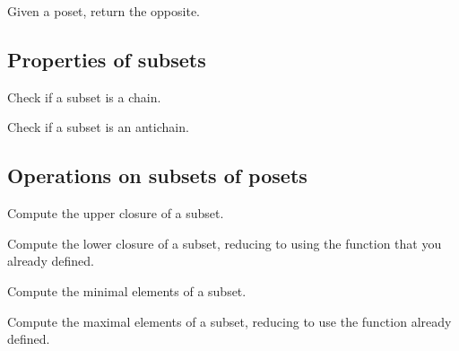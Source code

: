 \begin{exercise}
  Given a poset, return the opposite.
\end{exercise}

\subsection{Properties of subsets}


\begin{exercise}
  Check if a subset is a chain.
\end{exercise}

\begin{exercise}
  Check if a subset is an antichain.
\end{exercise}

\subsection{Operations on subsets of posets}

\begin{exercise}
  Compute the upper closure of a subset.

\end{exercise}


\begin{exercise}
  Compute the lower closure of a subset, reducing to
  using the function  that you
  already defined.

\end{exercise}



\begin{exercise}
  Compute the minimal elements of a subset.


\end{exercise}


\begin{exercise}
  Compute the maximal elements of a subset, reducing
  to use the function  already defined.


\end{exercise}



